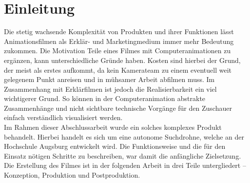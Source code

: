
\chapter{Einleitung}

Die stetig wachsende Komplexität von Produkten und ihrer Funktionen lässt Animationsfilmen als Erklär- und Marketingmedium immer mehr Bedeutung zukommen. Die Motivation Teile eines Filmes mit Computeranimationen zu ergänzen, kann unterschiedliche Gründe haben. Kosten sind hierbei der Grund, der meist als erstes aufkommt, da kein Kamerateam zu einem eventuell weit gelegenem Punkt anreisen und in mühsamer Arbeit abfilmen muss. Im Zusammenhang mit Erklärfilmen ist jedoch die Realisierbarkeit ein viel wichtigerer Grund. So können in der Computeranimation abstrakte Zusammenhänge und nicht sichtbare technische Vorgänge für den Zuschauer einfach verständlich visualisiert werden.\\
Im Rahmen dieser Abschlussarbeit wurde ein solches komplexes Produkt behandelt. Hierbei handelt es sich um eine autonome Suchdrohne, welche an der Hochschule Augsburg entwickelt wird. Die Funktionsweise und die für den Einsatz nötigen Schritte zu beschreiben, war damit die anfängliche Zielsetzung.
Die Erstellung des Filmes ist in der folgenden Arbeit in drei Teile untergliedert -- Konzeption, Produktion und Postproduktion.